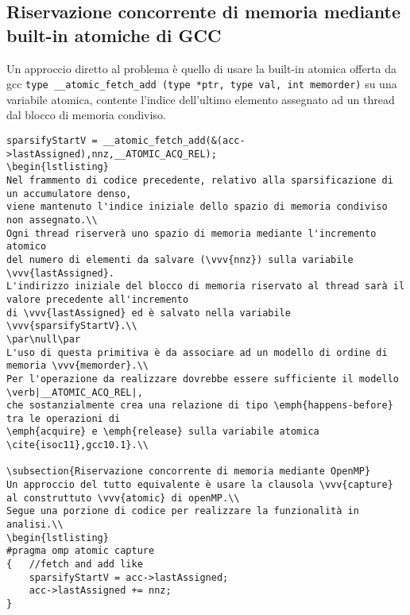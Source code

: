 \subsection{Riservazione concorrente di memoria mediante built-in atomiche di GCC}
Un approccio diretto al problema è quello di usare la built-in atomica offerta da gcc
\verb|type __atomic_fetch_add (type *ptr, type val, int memorder)|
su una variabile atomica, contente l'indice dell'ultimo elemento assegnato ad un thread dal blocco di memoria condiviso.\\
\begin{lstlisting}
sparsifyStartV = __atomic_fetch_add(&(acc->lastAssigned),nnz,__ATOMIC_ACQ_REL); 
\begin{lstlisting}
Nel frammento di codice precedente, relativo alla sparsificazione di un accumulatore denso,
viene mantenuto l'indice iniziale dello spazio di memoria condiviso non assegnato.\\
Ogni thread riserverà uno spazio di memoria mediante l'incremento atomico 
del numero di elementi da salvare (\vvv{nnz}) sulla variabile \vvv{lastAssigned}.
L'indirizzo iniziale del blocco di memoria riservato al thread sarà il valore precedente all'incremento
di \vvv{lastAssigned} ed è salvato nella variabile \vvv{sparsifyStartV}.\\
\par\null\par
L'uso di questa primitiva è da associare ad un modello di ordine di memoria \vvv{memorder}.\\
Per l'operazione da realizzare dovrebbe essere sufficiente il modello \verb|__ATOMIC_ACQ_REL|,
che sostanzialmente crea una relazione di tipo \emph{happens-before} tra le operazioni di 
\emph{acquire} e \emph{release} sulla variabile atomica  \cite{isoc11},gcc10.1}.\\

\subsection{Riservazione concorrente di memoria mediante OpenMP}
Un approccio del tutto equivalente è usare la clausola \vvv{capture} al construttuto \vvv{atomic} di openMP.\\
Segue una porzione di codice per realizzare la funzionalità in analisi.\\
\begin{lstlisting}
#pragma omp atomic capture
{   //fetch and add like 
    sparsifyStartV = acc->lastAssigned;
    acc->lastAssigned += nnz;
}
\end{lstlisting}

